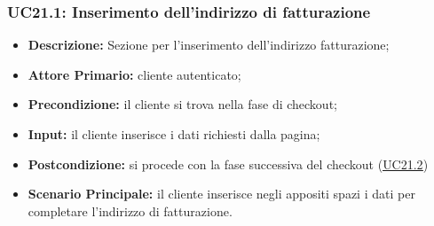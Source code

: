 \subsubsection{UC21.1: Inserimento dell'indirizzo di fatturazione}
\label{sec:UC21.1}
\begin{itemize}
    \item \textbf{Descrizione:} Sezione per l'inserimento dell'indirizzo fatturazione;
    \item \textbf{Attore Primario:} cliente autenticato;
    \item \textbf{Precondizione:} il cliente si trova nella fase di checkout;
    \item \textbf{Input:} il cliente inserisce i dati richiesti dalla pagina;
    \item \textbf{Postcondizione:} si procede con la fase successiva del checkout (\hyperref[sec:UC21.2]{\underline{UC21.2}})
    \item \textbf{Scenario Principale:} il cliente inserisce negli appositi spazi i dati per completare l'indirizzo di fatturazione.
\end{itemize}
